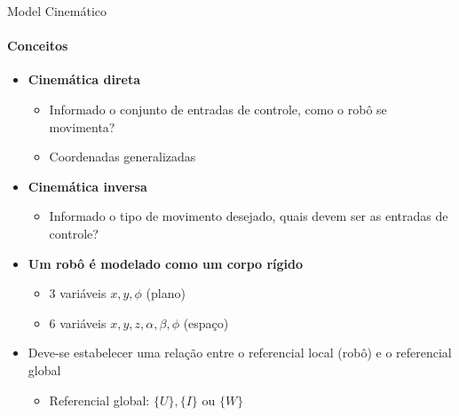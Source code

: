 \documentclass{beamer}
\begin{document}
\begin{frame}{Model Cinemático}
    \framesubtitle{Conceitos}
    \begin{itemize}
        \item \textbf{Cinemática direta}
        \begin{itemize}
            \item Informado o conjunto de entradas de controle, como o robô se movimenta?
            \item Coordenadas generalizadas
        \end{itemize} 
        \item \textbf{Cinemática inversa}
        \begin{itemize}
            \item Informado o tipo de movimento desejado,
        quais devem ser as entradas de controle?
        \end{itemize}
        \item \textbf{Um robô é modelado como um corpo rígido}
        \begin{itemize}
            \item 3 variáveis $x, y,\phi$ (plano)
            \item 6 variáveis $x,y,z, \alpha, \beta, \phi$ (espaço)
        \end{itemize}
        \item Deve-se estabelecer uma relação entre o referencial local (robô) e o referencial global
        \begin{itemize}
            \item Referencial global: $\{U\} , \{I\}$ ou $\{W\}$
        \end{itemize}         
    \end{itemize}
\end{frame}
\end{document}
